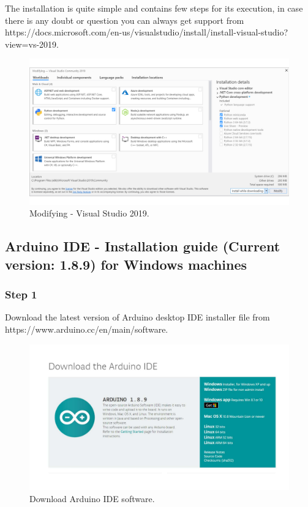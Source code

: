 \begin{refsection}
	The installation is quite simple and contains few steps for its execution, in case there is any doubt or question you can always get support from https://docs.microsoft.com/en-us/visualstudio/install/install-visual-studio?view=vs-2019.
	
	\begin{figure}[H]
		\centering
		\includegraphics[width=1\linewidth]{./sdf/arduino_quantum_rx/figures/VSworkloads.pdf}
		\caption{Modifying - Visual Studio 2019.}
		\label{vstudioWorkloads}
	\end{figure}
	
	\subsection{Arduino IDE - Installation guide (Current version: 1.8.9) for Windows machines}
	
	\subsubsection{Step 1}
	
	Download the latest version of Arduino desktop IDE installer file from https://www.arduino.cc/en/main/software.
	
	\begin{figure}[H]
		\centering
		\includegraphics[width=0.86\linewidth]{./sdf/arduino_quantum_rx/figures/arduinoDownload.pdf}
		\caption{Download Arduino IDE software.}
		\label{arduinoDownload}
	\end{figure}
	

\end{refsection}
